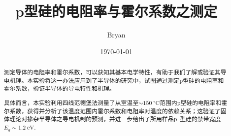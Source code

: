 \documentclass[aps,pre,12pt,preprint,%
	onecolumn,showpacs,showkeys,nofootinbib]{revtex4-1}
\begin{document}
	\title{%
	\texstringonly{\hfil\\[2\baselineskip]}
	\sf\LARGE%
		p型硅的电阻率与霍尔系数之测定%
	\texstringonly{\vspace{3ex}}}
	\author{\fangsong\large%
		Bryan%
	\vspace{2mm}}
	\date{\today}

\begin{abstract}
\vspace{10mm}
\begin{spacing}{1.5}\normalsize
\setlength{\parskip}{.3\baselineskip}
	测定导体的电阻率和霍尔系数，可以获知其基本电学特性，有助于我们了解或验证其导电机理。本实验将这一办法应用到了半导体的研究中，试图通过测定p型硅的电阻率和霍尔系数，验证半导体的导电特性和机理。
	
	具体而言，本实验利用四线范德堡法测量了从室温至$\sim\SI{150}{\celsius}$范围内p型硅的电阻率和霍尔系数，获得并分析了该温度范围内霍尔系数和电阻率对温度的依赖关系；这验证了固体理论对掺杂半导体之导电机制的预测，并进一步给出了所用样品p~型硅的禁带宽度$E_g \sim \SI{1.2}{\eV}$.
\end{spacing}
\end{abstract}

\maketitle
\thispagestyle{titlepagestyle}

\end{document}

